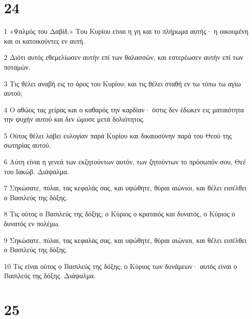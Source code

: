 \chapter{24}

\par 1 «Ψαλμός του Δαβίδ.» Του Κυρίου είναι η γη και το πλήρωμα αυτής· η οικουμένη και οι κατοικούντες εν αυτή.
\par 2 Διότι αυτός εθεμελίωσεν αυτήν επί των θαλασσών, και εστερέωσεν αυτήν επί των ποταμών.
\par 3 Τις θέλει αναβή εις το όρος του Κυρίου; και τις θέλει σταθή εν τω τόπω τω αγίω αυτού;
\par 4 Ο αθώος τας χείρας και ο καθαρός την καρδίαν· όστις δεν έδωκεν εις ματαιότητα την ψυχήν αυτού και δεν ώμοσε μετά δολιότητος.
\par 5 Ούτος θέλει λάβει ευλογίαν παρά Κυρίου και δικαιοσύνην παρά του Θεού της σωτηρίας αυτού.
\par 6 Αύτη είναι η γενεά των εκζητούντων αυτόν, των ζητούντων το πρόσωπόν σου, Θεέ του Ιακώβ. Διάψαλμα.
\par 7 Σηκώσατε, πύλαι, τας κεφαλάς σας, και υψώθητε, θύραι αιώνιοι, και θέλει εισέλθει ο Βασιλεύς της δόξης.
\par 8 Τις ούτος ο Βασιλεύς της δόξης; ο Κύριος ο κραταιός και δυνατός, ο Κύριος ο δυνατός εν πολέμω.
\par 9 Σηκώσατε, πύλαι, τας κεφαλάς σας, και υψώθητε, θύραι αιώνιοι, και θέλει εισέλθει ο Βασιλεύς της δόξης.
\par 10 Τις είναι ούτος ο Βασιλεύς της δόξης; ο Κύριος των δυνάμεων· αυτός είναι ο Βασιλεύς της δόξης. Διάψαλμα.

\chapter{25}

